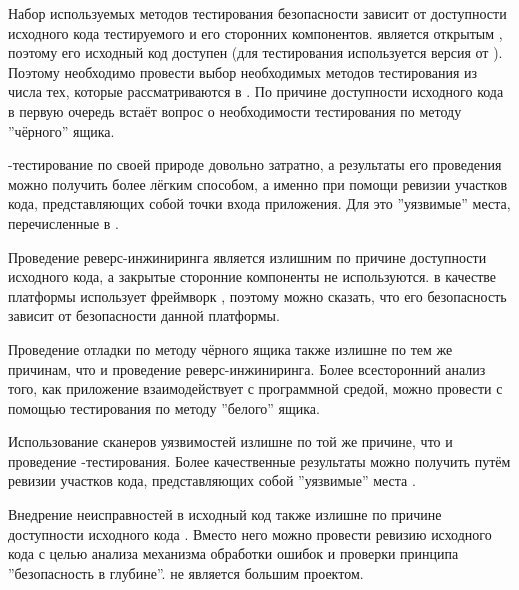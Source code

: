 %
Набор используемых методов тестирования безопасности  зависит от доступности исходного кода тестируемого  и его сторонних компонентов.
%
 является открытым , поэтому его исходный код доступен  (для тестирования используется версия  от ). 
%
Поэтому необходимо провести выбор необходимых методов тестирования из числа тех, которые рассматриваются в .
%
По причине доступности исходного кода в первую очередь встаёт вопрос о необходимости тестирования по методу ''чёрного'' ящика. 



%
-тестирование по своей природе довольно затратно, а результаты его проведения можно получить более лёгким способом, а именно при помощи ревизии участков кода, представляющих собой точки входа приложения.
%
Для  это ''уязвимые'' места, перечисленные в . 

%
Проведение реверс-инжиниринга является излишним по причине доступности исходного кода, а закрытые сторонние компоненты не используются. 
%
 в качестве платформы использует фреймворк  , поэтому можно сказать, что его безопасность зависит от безопасности данной платформы. 

%
Проведение отладки по методу чёрного ящика также излишне по тем же причинам, что и проведение реверс-инжиниринга. 
%
Более всесторонний анализ того, как приложение взаимодействует с программной средой, можно провести с помощью тестирования по методу ''белого'' ящика. 
%

%
Использование сканеров уязвимостей излишне по той же причине, что и проведение -тестирования. 
%
Более качественные результаты можно получить путём ревизии участков кода, представляющих собой ''уязвимые'' места . 

%
Внедрение неисправностей в исходный код также излишне по причине доступности исходного кода . 
%
Вместо него можно провести ревизию исходного кода с целью анализа механизма обработки ошибок и проверки принципа ''безопасность в глубине''. 
%
 не является большим проектом. 


